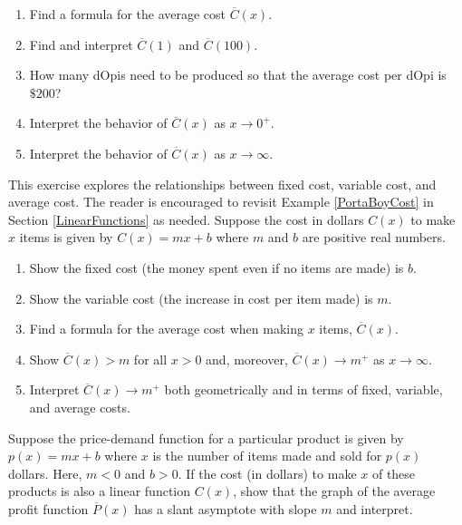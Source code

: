 \begin{exenum}
\begin{enumerate}

\item  Find a formula for the average cost $\overline{C}(x)$.

\item  Find and interpret $\overline{C}(1)$ and $\overline{C}(100)$.

\item  How many dOpis need to be produced so that the average cost per dOpi is $\$ 200$?

\item  Interpret the behavior of $\overline{C}(x)$ as $x \rightarrow 0^{+}$.

\item  Interpret the behavior of $\overline{C}(x)$ as $x \rightarrow \infty$.

\end{enumerate}

\item  \label{averagevariablecostexercise}   This exercise explores the relationships between fixed cost, variable cost, and average cost.  The reader is encouraged to revisit Example \ref{PortaBoyCost} in Section \ref{LinearFunctions} as needed.  Suppose the cost in dollars $C(x)$ to make $x$ items is given by $C(x) = mx + b$ where $m$ and $b$ are positive real numbers.

\begin{enumerate}

\item  Show the fixed cost (the money spent even if no items are made) is $b$.
\item  Show the variable cost (the increase in cost per item made) is $m$.
\item  Find a formula for the average cost when making $x$ items, $\overline{C}(x)$.
\item  Show $\overline{C}(x) > m$ for all $x>0$ and, moreover,   $\overline{C}(x)  \rightarrow m^{+}$ as $x \rightarrow \infty$.
\item  Interpret $\overline{C}(x)  \rightarrow m^{+}$ both geometrically and in terms of fixed, variable, and average costs.

\end{enumerate}

\item  \label{slantyintaverageprofitexercise} Suppose the price-demand function for a particular product is given by $p(x) = mx + b$  where $x$ is the number of items made and sold for $p(x)$ dollars.  Here,  $m<0$ and $b>0$.  If the cost (in dollars) to make $x$ of these products is also a linear  function $C(x)$, show that the graph of the average profit function $\overline{P}(x)$ has a slant asymptote with slope $m$ and interpret.


\end{exenum}
